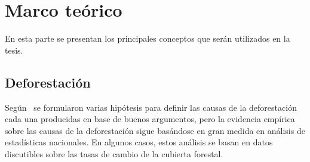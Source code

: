\chapter{Marco teórico}
\label{chap:marcoTeorico}
En esta parte se presentan los principales conceptos que serán utilizados en la tesis.
\section{Deforestación}


 Según~\cite{geist2002proximate} se formularon varias hipótesis para definir las causas de la deforestación cada una producidas en base de buenos argumentos, pero la evidencia empírica sobre las causas de la deforestación sigue basándose en gran medida en análisis de estadísticas nacionales. En algunos casos, estos análisis se basan en datos discutibles sobre las tasas de cambio de la cubierta forestal. 
 
